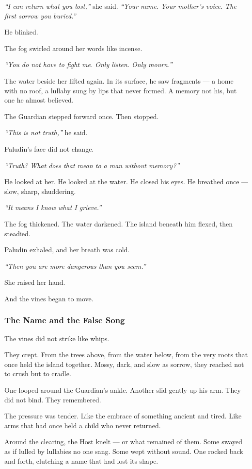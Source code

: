 \documentclass[12pt]{article}
\begin{document}
\textit{``I can return what you lost,''} she said. \textit{``Your name. Your mother’s voice. The first sorrow you buried.''}

He blinked.

The fog swirled around her words like incense.

\textit{``You do not have to fight me. Only listen. Only mourn.''}

The water beside her lifted again. In its surface, he saw fragments — a home with no roof, a lullaby sung by lips that never formed. A memory not his, but one he almost believed.

The Guardian stepped forward once. Then stopped.

\textit{``This is not truth,''} he said.

Paludin’s face did not change.

\textit{``Truth? What does that mean to a man without memory?''}

He looked at her. He looked at the water. He closed his eyes. He breathed once — slow, sharp, shuddering.

\textit{``It means I know what I grieve.''}

The fog thickened. The water darkened. The island beneath him flexed, then steadied.

Paludin exhaled, and her breath was cold.

\textit{``Then you are more dangerous than you seem.''}

She raised her hand.

And the vines began to move.

\dotfill

\subsubsection*{The Name and the False Song}

The vines did not strike like whips.

They crept. From the trees above, from the water below, from the very roots that once held the island together. Mossy, dark, and slow as sorrow, they reached not to crush but to cradle.

One looped around the Guardian’s ankle. Another slid gently up his arm. They did not bind. They remembered.

The pressure was tender. Like the embrace of something ancient and tired. Like arms that had once held a child who never returned.

Around the clearing, the Host knelt — or what remained of them. Some swayed as if lulled by lullabies no one sang. Some wept without sound. One rocked back and forth, clutching a name that had lost its shape.
\end{document}

